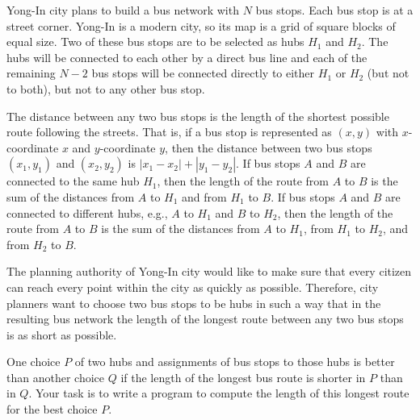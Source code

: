 Yong-In city plans to build a bus network with $N$ bus stops.
Each bus stop is at a street corner.
Yong-In is a modern city, so its map is a grid of square blocks of equal size.
Two of these bus stops are to be selected as hubs $H_1$ and $H_2$.
The hubs will be connected to each other by a direct bus line and each of the remaining $N - 2$ bus stops will be connected directly to either $H_1$ or $H_2$ (but not to both), but not to any other bus stop.

The distance between any two bus stops is the length of the shortest possible route following the streets.
That is, if a bus stop is represented as $(x, y)$ with $x$-coordinate $x$ and $y$-coordinate $y$, then the distance between two bus stops $(x_1, y_1)$ and $(x_2, y_2)$ is $|x_1 - x_2| + |y_1 - y_2|$.
If bus stops $A$ and $B$ are connected to the same hub $H_1$, then the length of the route from $A$ to $B$ is the sum of the distances from $A$ to $H_1$ and from $H_1$ to $B$.
If bus stops $A$ and $B$ are connected to different hubs, e.g., $A$ to $H_1$ and $B$ to $H_2$, then the length of the route from $A$ to $B$ is the sum of the distances from $A$ to $H_1$, from $H_1$ to $H_2$, and from $H_2$ to $B$.

The planning authority of Yong-In city would like to make sure that every citizen can
reach every point within the city as quickly as possible. Therefore, city planners want to
choose two bus stops to be hubs in such a way that in the resulting bus network the
length of the longest route between any two bus stops is as short as possible.

One choice $P$ of two hubs and assignments of bus stops to those hubs is better than
another choice $Q$ if the length of the longest bus route is shorter in $P$ than in $Q$.
Your task is to write a program to compute the length of this longest route for the best choice $P$.